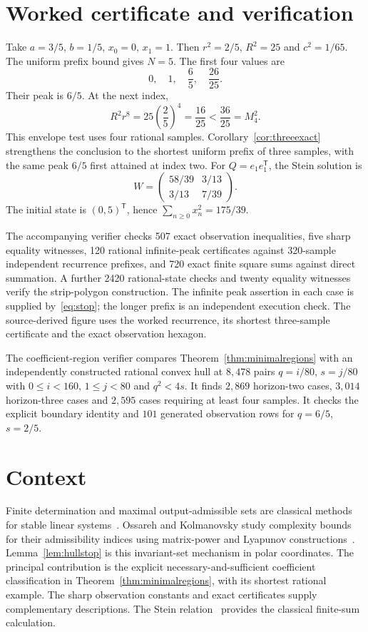 \documentclass[11pt,a4paper]{article}
\begin{document}
\section{Worked certificate and verification}
Take $a=3/5$, $b=1/5$, $x_0=0$, $x_1=1$. Then
$r^2=2/5$, $R^2=25$ and $c^2=1/65$.
The uniform prefix bound gives $N=5$. The first four values are
\[
 0,\quad1,\quad\frac65,\quad\frac{26}{25}.
\]
Their peak is $6/5$. At the next index,
\[
 R^2r^8=25\left(\frac25\right)^4
 =\frac{16}{25}<\frac{36}{25}=M_4^2.
\]
This envelope test uses four rational samples. Corollary~\ref{cor:threeexact}
strengthens the conclusion to the shortest uniform prefix of three samples,
with the same peak $6/5$ first attained at index two. For $Q=e_1e_1^\mathsf T$, the Stein solution is
\[
 W=\begin{pmatrix}58/39&3/13\\3/13&7/39\end{pmatrix}.
\]
The initial state is $(0,5)^\mathsf T$, hence
$\sum_{n\ge0}x_n^2=175/39$.

The accompanying verifier checks 507 exact observation inequalities,
five sharp equality witnesses, 120 rational infinite-peak certificates
against 320-sample independent recurrence prefixes, and 720 exact finite
square sums against direct summation. A further 2420 rational-state checks
and twenty equality witnesses verify the strip-polygon construction. The infinite peak assertion in each
case is supplied by~\eqref{eq:stop}; the longer prefix is an independent
execution check. The source-derived figure uses the worked recurrence, its shortest
three-sample certificate and the exact observation hexagon.

The coefficient-region verifier compares Theorem~\ref{thm:minimalregions}
with an independently constructed rational convex hull at $8,478$ pairs
$q=i/80$, $s=j/80$ with $0\le i<160$, $1\le j<80$ and $q^2<4s$.
It finds $2,869$ horizon-two cases, $3,014$ horizon-three cases and $2,595$
cases requiring at least four samples. It checks the explicit boundary
identity and $101$ generated observation rows for $q=6/5$, $s=2/5$.

\section{Context}
Finite determination and maximal output-admissible sets are classical
methods for stable linear systems~\cite{gilbert}. Ossareh and Kolmanovsky
study complexity bounds for their admissibility indices using matrix-power
and Lyapunov constructions~\cite{ossareh}. Lemma~\ref{lem:hullstop} is
this invariant-set mechanism in polar coordinates. The principal
contribution is the explicit necessary-and-sufficient coefficient
classification in Theorem~\ref{thm:minimalregions}, with its shortest
rational example. The sharp observation constants and exact certificates
supply complementary descriptions. The Stein relation~\cite{stein}
provides the classical finite-sum calculation.
\end{document}
